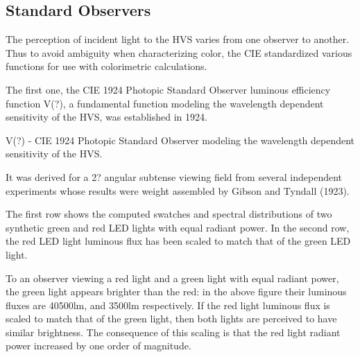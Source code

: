 \subsection{Standard Observers}%
\label{subsec:standard-observers}

The perception of incident light to the HVS varies from one observer to another. Thus to avoid ambiguity when characterizing color, the CIE standardized various functions for use with colorimetric calculations.

The first one, the CIE 1924 Photopic Standard Observer luminous efficiency function V(?), a fundamental function modeling the wavelength dependent sensitivity of the HVS, was established in 1924.

V(?) - CIE 1924 Photopic Standard Observer modeling the wavelength dependent sensitivity of the HVS.

It was derived for a 2? angular subtense viewing field from several independent experiments whose results were weight assembled by Gibson and Tyndall (1923).

The first row shows the computed swatches and spectral distributions of two synthetic green and red LED lights with equal radiant power. In the second row, the red LED light luminous flux has been scaled to match that of the green LED light.

To an observer viewing a red light and a green light with equal radiant power, the green light appears brighter than the red: in the above figure their luminous fluxes are 40500lm, and 3500lm respectively. If the red light luminous flux is scaled to match that of the green light, then both lights are perceived to have similar brightness. The consequence of this scaling is that the red light radiant power increased by one order of magnitude.





